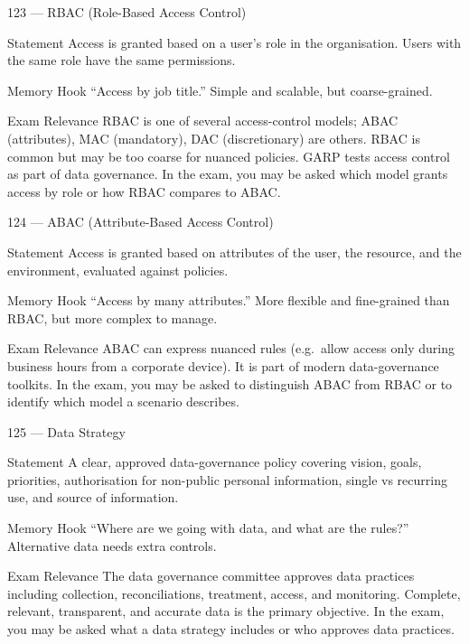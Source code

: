 \documentclass[aspectratio=169,8pt]{beamer}
\begin{document}
	\begin{frame}{123 --- RBAC (Role-Based Access Control)}
		\begin{block}{Statement}
			Access is granted based on a user's role in the organisation. Users with the same role have the same permissions.
		\end{block}
		\begin{block}{Memory Hook}
			``Access by job title.'' Simple and scalable, but coarse-grained.
		\end{block}
		\begin{block}{Exam Relevance}
			RBAC is one of several access-control models; ABAC (attributes), MAC (mandatory), DAC (discretionary) are others. RBAC is common but may be too coarse for nuanced policies. GARP tests access control as part of data governance. In the exam, you may be asked which model grants access by role or how RBAC compares to ABAC.
		\end{block}
	\end{frame}
	
	\begin{frame}{124 --- ABAC (Attribute-Based Access Control)}
		\begin{block}{Statement}
			Access is granted based on attributes of the user, the resource, and the environment, evaluated against policies.
		\end{block}
		\begin{block}{Memory Hook}
			``Access by many attributes.'' More flexible and fine-grained than RBAC, but more complex to manage.
		\end{block}
		\begin{block}{Exam Relevance}
			ABAC can express nuanced rules (e.g.\ allow access only during business hours from a corporate device). It is part of modern data-governance toolkits. In the exam, you may be asked to distinguish ABAC from RBAC or to identify which model a scenario describes.
		\end{block}
	\end{frame}
	
	\begin{frame}{125 --- Data Strategy}
		\begin{block}{Statement}
			A clear, approved data-governance policy covering vision, goals, priorities, authorisation for non-public personal information, single vs recurring use, and source of information.
		\end{block}
		\begin{block}{Memory Hook}
			``Where are we going with data, and what are the rules?'' Alternative data needs extra controls.
		\end{block}
		\begin{block}{Exam Relevance}
			The data governance committee approves data practices including collection, reconciliations, treatment, access, and monitoring. Complete, relevant, transparent, and accurate data is the primary objective. In the exam, you may be asked what a data strategy includes or who approves data practices.
		\end{block}
	\end{frame}
	
\end{document}

